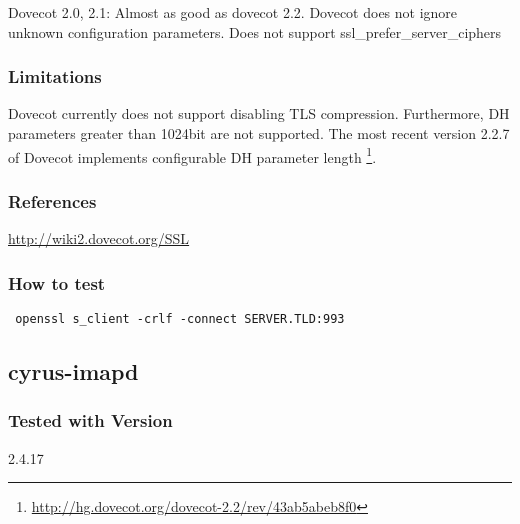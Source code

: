 Dovecot 2.0, 2.1: Almost as good as dovecot 2.2. Dovecot does not ignore unknown configuration parameters. Does not support
ssl\_prefer\_server\_ciphers

\subsubsection{Limitations}

Dovecot currently does not support disabling TLS compression. Furthermore, DH
parameters greater than 1024bit are not supported. The most recent version
2.2.7 of Dovecot implements configurable DH parameter length
\footnote{\url{http://hg.dovecot.org/dovecot-2.2/rev/43ab5abeb8f0}}.



\subsubsection{References} \url{http://wiki2.dovecot.org/SSL}


\subsubsection{How to test}
\begin{lstlisting}
 openssl s_client -crlf -connect SERVER.TLD:993
\end{lstlisting}



\subsection{cyrus-imapd}

\subsubsection{Tested with Version}
2.4.17

